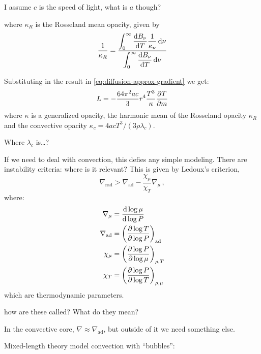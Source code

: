 \documentclass[main.tex]{subfiles}
\begin{document}
\begin{greenbox}
  I assume \(c\) is the speed of light, what is \(a\) though?
\end{greenbox}

%
where \(\kappa_R\) is the Rosseland mean opacity, given by
%
\begin{equation}
  \frac{1}{\kappa_{R}} =
  \frac{ \displaystyle\int _{0}   ^{\infty}  \dv{B_\nu}{T} \frac{1}{\kappa_\nu} \dd{\nu}}
  {  \displaystyle \int _{0}   ^{\infty} \dv{B_\nu}{T} \dd{\nu}}
\end{equation}

Substituting in the result in \eqref{eq:diffusion-approx-gradient} we get:
%
\begin{equation}
    L = - \frac{64 \pi^2 a c }{3} r^4 \frac{T^3}{\kappa} \pdv{T}{m}
\end{equation}
%
where \(\kappa\) is a generalized opacity, the harmonic mean of the Rosseland opacity \(\kappa _R \) and the convective opacity \(\kappa_c = 4acT^3 / (3 \rho \lambda_c )\).

\begin{greenbox}
  Where \(\lambda_c\) is\dots  ?
\end{greenbox}

If we need to deal with convection, this defies any simple modeling. There are instability criteria: where is it relevant? This is given by
Ledoux's criterion,
%
\begin{equation}
    \nabla_{\text{rad}} > \nabla_{\text{ad}} - \frac{\chi_\mu}{\chi_T} \nabla_\mu\,,
\end{equation}
%
where:
%
\begin{subequations}
\begin{align}
  \nabla_\mu  &= \dv{\log \mu }{\log P} \\
  \nabla_{\text{ad}}  &= \qty(\pdv{\log T }{\log P} )_{\text{ad}} \\
  \chi_{\mu}  &= \qty(\pdv{\log P }{\log \mu} )_{\rho, T} \\
  \chi_{T}  &= \qty(\pdv{\log P }{\log T} )_{\rho, \mu}
\end{align}
\end{subequations}
%
which are thermodynamic parameters.

\begin{greenbox}
  how are these called? What do they mean?
\end{greenbox}

In the convective core, \(\nabla \approx \nabla_{\text{ad}}\), but outside of it we need something else.

Mixed-length theory model convection with ``bubbles'':
\end{document}
